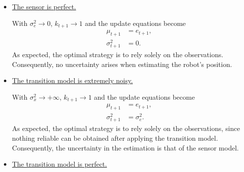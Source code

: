 \documentclass[11pt, a4paper]{exam}
\begin{document}
\begin{exercises}
\begin{parts}
\begin{solution}
\begin{itemize}
            With $\sigma^2_e \rightarrow + \infty$, $k_{t+1} \rightarrow 0$ and the update equations become
            \begin{align*}
                \mu_{t+1} & = \mu_t + b, \\
                \sigma^2_{t+1} & = \sigma^2_t + \sigma^2_x.
            \end{align*}
            As expected, the optimal strategy is to completely ignore the observations and rely solely on the initial belief and the transition model. The uncertainty is indeed the combination of the uncertainty in the transition model and the uncertainty of the previous state, which ultimately originates from the uncertainty in the initial belief.

            \item \underline{The sensor is perfect.}

            With $\sigma^2_e \rightarrow 0$, $k_{t+1} \rightarrow 1$ and the update equations become
            \begin{align*}
                \mu_{t+1} & = e_{t+1}, \\
                \sigma^2_{t+1} & = 0.
            \end{align*}
            As expected, the optimal strategy is to rely solely on the observations. Consequently, no uncertainty arises when estimating the robot's position.

            \item \underline{The transition model is extremely noisy.}

            With $\sigma^2_x \rightarrow + \infty$, $k_{t+1} \rightarrow 1$ and the update equations become
            \begin{align*}
                \mu_{t+1} & = e_{t+1}, \\
                \sigma^2_{t+1} & = \sigma^2_e.
            \end{align*}
            As expected, the optimal strategy is to rely solely on the observations, since nothing reliable can be obtained after applying the transition model. Consequently, the uncertainty in the estimation is that of the sensor model.

            \item \underline{The transition model is perfect.}


\end{itemize}
\end{solution}
\end{parts}
\end{exercises}
\end{document}
